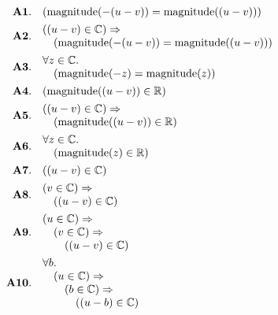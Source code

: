 \documentclass[11pt]{article}
\theoremstyle{plain}
\begin{document}
\begin{align*}
  \mathbf{A1.}\quad & (\operatorname{magnitude}(-(u - v)) = \operatorname{magnitude}((u - v))) \\
  \mathbf{A2.}\quad & \begin{array}{@{}l@{}} ((u - v) \in \mathbb{C}) \Rightarrow  \\ \quad (\operatorname{magnitude}(-(u - v)) = \operatorname{magnitude}((u - v))) \end{array} \\
  \mathbf{A3.}\quad & \begin{array}{@{}l@{}} \forall z \in \mathbb{C}. \\ \quad (\operatorname{magnitude}(-z) = \operatorname{magnitude}(z)) \end{array} \\
  \mathbf{A4.}\quad & (\operatorname{magnitude}((u - v)) \in \mathbb{R}) \\
  \mathbf{A5.}\quad & \begin{array}{@{}l@{}} ((u - v) \in \mathbb{C}) \Rightarrow  \\ \quad (\operatorname{magnitude}((u - v)) \in \mathbb{R}) \end{array} \\
  \mathbf{A6.}\quad & \begin{array}{@{}l@{}} \forall z \in \mathbb{C}. \\ \quad (\operatorname{magnitude}(z) \in \mathbb{R}) \end{array} \\
  \mathbf{A7.}\quad & ((u - v) \in \mathbb{C}) \\
  \mathbf{A8.}\quad & \begin{array}{@{}l@{}} (v \in \mathbb{C}) \Rightarrow  \\ \quad ((u - v) \in \mathbb{C}) \end{array} \\
  \mathbf{A9.}\quad & \begin{array}{@{}l@{}} (u \in \mathbb{C}) \Rightarrow  \\ \quad (v \in \mathbb{C}) \Rightarrow  \\ \quad \quad ((u - v) \in \mathbb{C}) \end{array} \\
  \mathbf{A10.}\quad & \begin{array}{@{}l@{}} \forall b. \\ \quad (u \in \mathbb{C}) \Rightarrow  \\ \quad \quad (b \in \mathbb{C}) \Rightarrow  \\ \quad \quad \quad ((u - b) \in \mathbb{C}) \end{array} \\

\end{align*}
\end{document}
